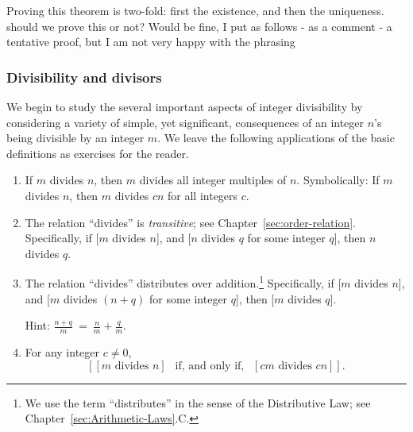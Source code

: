Proving this theorem is two-fold: first the existence, and then the uniqueness.
{\Denis should we prove this or not? Would be fine, I put as follows - as a comment - a tentative proof, but I am not very happy with the phrasing}
%
%
%
%




\subsubsection{Divisibility and divisors}
\label{sec:divisibility+GCD}

We begin to study the several important aspects of integer
divisibility by considering a variety of simple, yet significant,
consequences of an integer $n$'s being divisible by an integer $m$.
We leave the following applications of the basic definitions as
exercises for the reader.

\begin{prop}
\begin{enumerate}
\item
If $m$ divides $n$, then $m$ divides all integer multiples of $n$.
Symbolically: If $m$ divides $n$, then $m$ divides $cn$ for all
integers $c$.
\item
The relation ``divides'' is {\em transitive}; see
Chapter~\ref{sec:order-relation}.  Specifically, if [$m$ divides $n$],
and [$n$ divides $q$ for some integer $q$], then $n$ divides $q$.
\item
The relation ``divides'' distributes over addition.\footnote{We use
  the term ``distributes'' in the sense of the Distributive Law; see
  Chapter~\ref{sec:Arithmetic-Laws}.C.}  Specifically, if [$m$ divides
  $n$], and [$m$ divides $(n+q)$ for some integer $q$], then [$m$
  divides $q$].

Hint: $\displaystyle \frac{n+q}{m} \ = \ \frac{n}{m} + \frac{q}{m}$.

\item 
For any integer $c \neq 0$,
\[ \left[[m \mbox{ divides } n] \ \ \mbox{ if, and only if, } \ \ [cm
    \mbox{ divides } cn] \right]. \]
\end{enumerate}
\end{prop}

